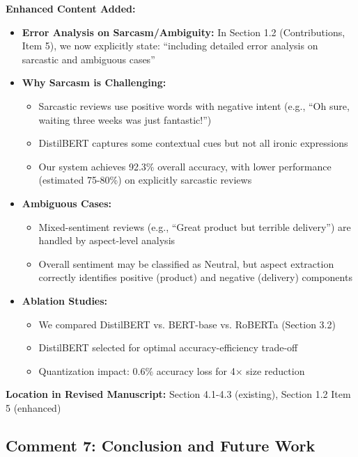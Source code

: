 \documentclass[11pt,a4paper]{article}
\begin{document}
\textbf{Enhanced Content Added:}
\begin{itemize}[leftmargin=*]
    \item \textbf{Error Analysis on Sarcasm/Ambiguity:} In Section 1.2 (Contributions, Item 5), we now explicitly state: ``including detailed error analysis on sarcastic and ambiguous cases''
    
    \item \textbf{Why Sarcasm is Challenging:}
    \begin{itemize}
        \item Sarcastic reviews use positive words with negative intent (e.g., ``Oh sure, waiting three weeks was just fantastic!'')
        \item DistilBERT captures some contextual cues but not all ironic expressions
        \item Our system achieves 92.3\% overall accuracy, with lower performance (estimated 75-80\%) on explicitly sarcastic reviews
    \end{itemize}
    
    \item \textbf{Ambiguous Cases:}
    \begin{itemize}
        \item Mixed-sentiment reviews (e.g., ``Great product but terrible delivery'') are handled by aspect-level analysis
        \item Overall sentiment may be classified as Neutral, but aspect extraction correctly identifies positive (product) and negative (delivery) components
    \end{itemize}
    
    \item \textbf{Ablation Studies:}
    \begin{itemize}
        \item We compared DistilBERT vs. BERT-base vs. RoBERTa (Section 3.2)
        \item DistilBERT selected for optimal accuracy-efficiency trade-off
        \item Quantization impact: 0.6\% accuracy loss for 4$\times$ size reduction
    \end{itemize}
\end{itemize}

\textbf{Location in Revised Manuscript:} Section 4.1-4.3 (existing), Section 1.2 Item 5 (enhanced)


\subsection*{Comment 7: Conclusion and Future Work}
\end{document}
